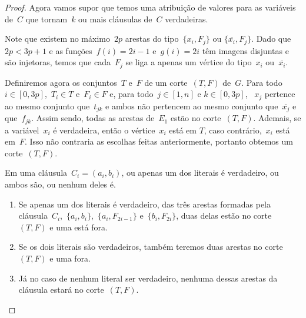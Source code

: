 \begin{proof}
		
		\bigskip
		\bigskip

		Agora vamos supor que temos uma atribuição de valores para 
		as variáveis de~$C$ que tornam~$k$ ou mais cláusulas
		de~$C$ verdadeiras.

		Note que existem no máximo~$2p$ arestas do 
		tipo~${\{x_i,F_j\}}$ ou ${\{\overline{x_i},F_j\}}$. 
		Dado que~${2p<3p+1}$ e
		as funções~${f(i)=2i - 1}$ e~${g(i)=2i}$ têm 
		imagens disjuntas e são injetoras, 
		temos que cada~$F_j$ se liga a apenas um vértice
		do tipo~$x_i$ ou~${\overline{x_i}}$.

		Definiremos agora os
		conjuntos~$T$ e~$F$ de um corte~$(T,F)$ de~$G$.
		Para todo~${i\in[0,3p]}$,~${T_i\in T}$ 
		e~${F_i\in F}$ e,
		para todo~${j\in[1,n]}$ e ${k\in[0,3p]}$, ~$x_j$ pertence ao 
		mesmo conjunto que~$t_{jk}$ e ambos não pertencem ao mesmo 
		conjunto que~$\overline{x_j}$ e que~$f_{jk}$.
		Assim sendo, todas as arestas de~$E_1$ estão no 
		corte~$(T,F)$.
		Ademais, se a variável~$x_i$ é verdadeira,
		então o vértice~$x_i$ está em $T$, caso contrário,~$x_i$
		está em~$F$.
		Isso não contraria as escolhas feitas anteriormente, portanto 
		obtemos um corte~$(T,F)$.

		Em uma cláusula~${C_i=(a_i,b_i)}$, ou
		apenas um dos literais é verdadeiro, ou ambos são, ou nenhum
		deles é.
		\begin{enumerate}
			\item Se apenas um dos literais é verdadeiro,
			das três arestas formadas pela 
			cláusula~$C_i$,~$\{a_i,b_i\}$,~$\{a_i, F_{2i-1}\}$
			e~$\{b_i, F_{2i}\}$, duas delas
			estão no corte~$(T,F)$ e uma está fora.
			\item Se os dois literais são verdadeiros, também teremos
			duas arestas no corte~$(T,F)$ e uma fora.
			\item Já no caso de nenhum literal ser verdadeiro, nenhuma
			dessas arestas da cláusula estará no corte~$(T,F)$.
		\end{enumerate}


\end{proof}
